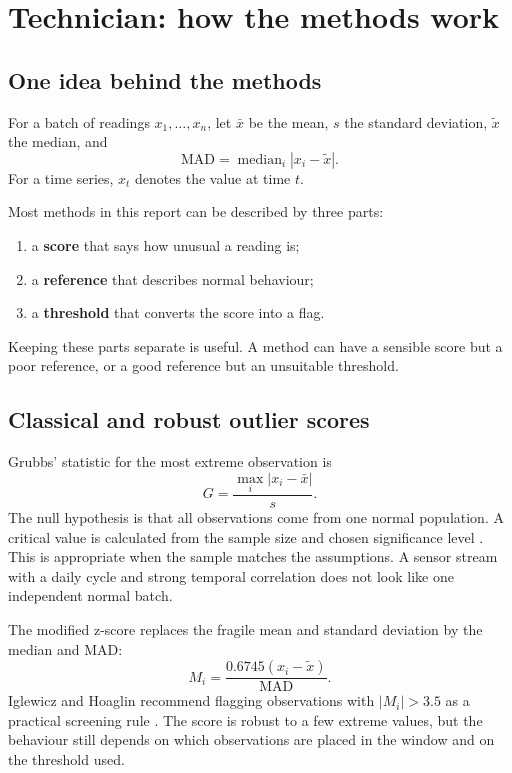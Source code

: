 \clearpage
\section{Technician: how the methods work}
\label{sec:methods}

\subsection{One idea behind the methods}

For a batch of readings $x_1,\ldots,x_n$, let $\bar{x}$ be the mean, $s$ the
standard deviation, $\tilde{x}$ the median, and
\[
\mathrm{MAD}=\operatorname{median}_i |x_i-\tilde{x}|.
\]
For a time series, $x_t$ denotes the value at time $t$.

Most methods in this report can be described by three parts:

\begin{enumerate}
  \item a \textbf{score} that says how unusual a reading is;
  \item a \textbf{reference} that describes normal behaviour;
  \item a \textbf{threshold} that converts the score into a flag.
\end{enumerate}

Keeping these parts separate is useful. A method can have a sensible score
but a poor reference, or a good reference but an unsuitable threshold.

\subsection{Classical and robust outlier scores}

Grubbs' statistic for the most extreme observation is
\begin{equation}
G=\frac{\max_i |x_i-\bar{x}|}{s}.
\label{eq:grubbs}
\end{equation}
The null hypothesis is that all observations come from one normal
population. A critical value is calculated from the sample size and chosen
significance level \citep{grubbs1969}. This is appropriate when the sample
matches the assumptions. A sensor stream with a daily cycle and strong
temporal correlation does not look like one independent normal batch.

The modified z-score replaces the fragile mean and standard deviation by the
median and MAD:
\begin{equation}
M_i=\frac{0.6745(x_i-\tilde{x})}{\mathrm{MAD}}.
\label{eq:modz}
\end{equation}
Iglewicz and Hoaglin recommend flagging observations with
$|M_i|>3.5$ as a practical screening rule \citep{iglewicz1993}. The score is
robust to a few extreme values, but the behaviour still depends on which
observations are placed in the window and on the threshold used.

